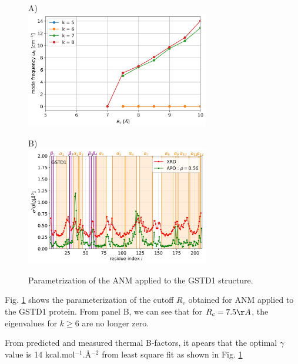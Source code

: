 \begin{figure}[h!]
	\begin{minipage}{.48\linewidth}
		A)\\
		\includegraphics[width = 8cm]{figures/GSTD1_ANM-COM_Rc_param.jpg}
	\end{minipage}
	\begin{minipage}{.48\linewidth}
		B)\\
		\includegraphics[width = 8cm]{figures/GSTD1_APO_MSF.jpg}
	\end{minipage}
	
	\caption{Parametrization of the ANM applied to the GSTD1 structure.}
	\label{params}	
\end{figure}

\noindent Fig. \ref{params} shows the parameterization of the cutoff $R_c$ obtained for ANM applied to the GSTD1 protein. From panel B, we can see that for $R_c = 7.5\AA$, the eigenvalues for $k \ge 6$ are no longer zero.

\noindent From predicted and measured thermal B-factors, it apears that the optimal $\gamma$ value is 14 kcal.mol$^{-1}$.\AA$^{-2}$ from least square fit as shown in Fig. \ref{params}